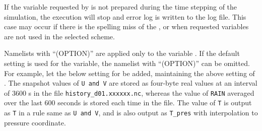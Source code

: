 If the variable requested by  is not prepared during the time stepping of the simulation, the execution will stop and error log is written to the log file.
This case may occur if there is the spelling miss of the , or when requested variables are not used in the selected scheme.

Namelists with ``(OPTION)'' are applied only to the variable . If the default setting is used for the variable, the namelist with ``(OPTION)'' can be omitted. For example, let the below setting for  be added, maintaining the above setting of . The snapshot values of \verb|U and V| are stored as four-byte real values at an interval of 3600 s in the file \verb|history_d01.xxxxxx.nc|, whereas the value of \verb|RAIN| averaged over the last 600 seconds is stored each time in the file. The value of \verb|T| is output as \verb|T| in a rule same as \verb|U and V|, and is also output as \verb|T_pres| with interpolation to pressure coordinate.




